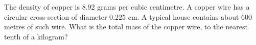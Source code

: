 The density of copper is $8.92$ grams per cubic centimetre. A copper wire has a circular cross-section of diameter $0.225$ cm. A typical house contains about $600$ metres of such wire. What is the total mass of the copper wire, to the nearest tenth of a kilogram?
